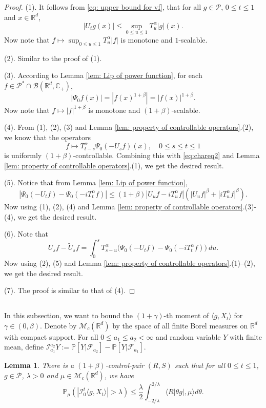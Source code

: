 \documentclass[12pt]{amsart}
\theoremstyle{plain}
\newtheorem{lem}[thm]{Lemma}
\theoremstyle{definition}
\numberwithin{equation}{section}
\begin{document}
\begin{proof}
    (1). It follows from \eqref{eq: upper bound for vf}, that for all $g\in \mathcal P$, $0\leq t\leq 1$ and $x\in \mathbb R^d$,
\[
    |U_t g(x)|
    \leq \sup_{0\leq u\leq 1}T_u^\alpha |g| (x).
\]
    Now note that $f\mapsto\sup_{0\leq u\leq 1}T^{\alpha}_u|f|$ is monotone and $1$-scalable.

    (2). Similar to the proof of (1).

    (3). According to Lemma \ref{lem: Lip of power function}, for each $f\in \mathcal P^* \cap \mathcal B(\mathbb R^d, \mathbb C_+)$,
\[
    |\Psi_0 f(x)| = |f(x)^{1+\beta}| = |f(x)|^{1+\beta}.
\]
    Now note that $f\mapsto |f|^{1+\beta}$ is monotone and $(1+\beta)$-scalable.

    (4). From (1), (2), (3) and Lemma \ref{lem: property of controllable operators}.(2), we know that the operators
\[
    f
    \mapsto T^{\alpha}_{t-s}\Psi_0(-U_sf)(x),
    \quad 0\leq s\leq t\leq 1
\]
    is uniformly $(1+\beta)$-controllable.
    Combining this with \eqref{eq:chareq2} and Lemma \ref{lem: property of controllable operators}.(1), we get the desired result.

    (5).  Notice that from Lemma \ref{lem: Lip of power function},
\[
    |\Psi_0(-U_t f) - \Psi_0(-iT_t^\alpha f) |
    \leq  (1+\beta) |U_u f-iT_u^{\alpha}f|(|U_u f|^{\beta}+|i T_u^{\alpha}f|^{\beta}).
\]
    Now using (1), (2), (4) and Lemma \ref{lem: property of controllable operators}.(3)-(4), we get the desired result.

    (6). Note that
\[
    U_sf - \tilde U_sf
    = \int_0^s T_{s-u}^{\alpha}\big(\Psi_0(-U_t f)-\Psi_0(-i T_t^{\alpha}f)\big)~du.
\]
    Now using (2), (5) and Lemma \ref{lem: property of controllable operators}.(1)--(2), we get the desired result.

    (7). The proof is similar to that of (4).
\end{proof}

\subsection{}

 In this subsection,  we want to bound the $(1+\gamma)$-th moment of $\langle g ,X_t \rangle$ for $\gamma \in (0,\beta)$. Denote by $\mathcal{M}_c(\mathbb{R}^d)$ by the space of all finite Borel measures on $\mathbb{R}^d$ with compact support.
	For all $0 \leq a_1 \leq a_2 <\infty$ and  random variable $Y$ with finite mean, define
$
   	\mathcal I_{a_1}^{a_2} Y
    := \mathbb P[Y|\mathscr F_{a_2}] - \mathbb P[Y|\mathscr F_{a_1}].
$
\begin{lem}
\label{lem: control pair for P(M>lambda)}
    There is a $(1+\beta)$-control-pair $(R,S)$ such that for all $0\leq t\leq 1$, $g\in \mathcal P$, $\lambda >0$ and $\mu\in \mathcal M_c(\mathbb R^d)$, we have
\[
    \mathbb P_\mu ( |\mathcal{I}_0^t\langle g,X_t\rangle| > \lambda)
    \leq \frac{\lambda}{2}\int_{-2/\lambda}^{2/\lambda}\langle R|\theta g|,\mu\rangle d\theta.
\]
\end{lem}
\end{document}
